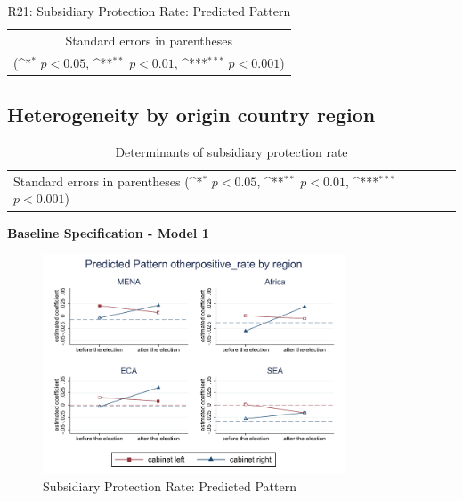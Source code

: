 \documentclass[10pt,a4paper]{scrartcl}
\begin{document}
\begin{table}[!ht]\centering
	\footnotesize
	\renewcommand{\arraystretch}{1.15}
	\def\sym#1{\ifmmode^{#1}\else\(^{#1}\)\fi}
	\caption{R21: Subsidiary Protection Rate: Predicted Pattern}
	\begin{tabular}{l*{2}{c}}
		\hline\hline
		
		\hline\hline
		\multicolumn{3}{c}{\footnotesize Standard errors in parentheses} \\
		\multicolumn{3}{c}{\footnotesize (\sym{*} \(p<0.05\), \sym{**} \(p<0.01\), \sym{***} \(p<0.001\))} \\
	\end{tabular}
\end{table}



\clearpage
\FloatBarrier
\subsection{Heterogeneity by origin country region}
\begin{table}[!ht]\centering
	\renewcommand{\arraystretch}{1.25}
	\small
	\def\sym#1{\ifmmode^{#1}\else\(^{#1}\)\fi}
	\caption{Determinants of subsidiary protection rate}
	\begin{tabular}{l*{4}{c}}
		\hline\hline
		
		\hline\hline
		\multicolumn{5}{l}{\footnotesize Standard errors in parentheses (\sym{*} \(p<0.05\), \sym{**} \(p<0.01\), \sym{***} \(p<0.001\))}\\
	\end{tabular}
\end{table}

\clearpage
\textbf{Baseline Specification - Model 1}
\begin{figure}[!ht]
	\centering
	\includegraphics[width=0.8\textwidth]{figures_edited/otherpositive_rate_graph1_by_region.pdf}
	\caption{Subsidiary Protection Rate: Predicted Pattern}
\end{figure}
\end{document}
